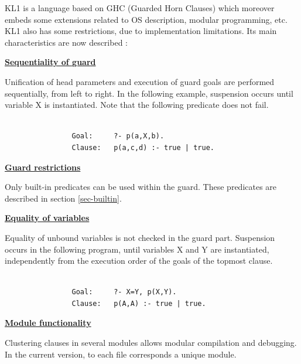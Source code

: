 KL1 is a language based on GHC (Guarded Horn Clauses) which
moreover embeds some extensions related to OS description, modular
programming, etc. KL1 also has some restrictions, due to implementation
limitations. Its main characteristics are now described :
\vspace{1ex}

\noindent\underline{\bf Sequentiality of guard}
\vspace{1ex}\par
Unification of head parameters and execution of guard goals are performed
sequentially, from left to right. In the following example, suspension occurs
until variable X is instantiated. Note that the following predicate
does not fail.
\begin{verbatim}

                Goal:     ?- p(a,X,b).
                Clause:   p(a,c,d) :- true | true.

\end{verbatim}
\vspace{1ex}

\noindent\underline{\bf Guard restrictions}\vspace{1ex}\par
Only built-in predicates can be used within the guard. These predicates are
described in section \ref{sec-builtin}.
\vspace{1ex}

\noindent\underline{\bf Equality of variables}\vspace{1ex}\par
Equality of unbound variables is not checked in the guard part. Suspension
occurs in the following program, until variables X and Y are instantiated,
independently from the execution order of the goals of the topmost clause.
\begin{verbatim}

                Goal:     ?- X=Y, p(X,Y).
                Clause:   p(A,A) :- true | true.

\end{verbatim}
\vspace{1ex}

\noindent\underline{\bf Module functionality}\vspace{1ex}\par
Clustering clauses in several modules allows modular compilation and
debugging. In the current version, to each file corresponds a unique module.
\vspace{1ex}

